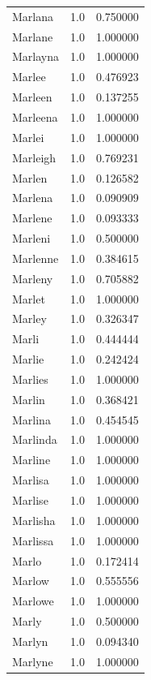 \documentclass[
  letterpaper,
  DIV=11,
  numbers=noendperiod]{scrreprt}
\begin{document}
\begin{tabular}{lrr}
Marlana         &   1.0 &   0.750000 \\
Marlane         &   1.0 &   1.000000 \\
Marlayna        &   1.0 &   1.000000 \\
Marlee          &   1.0 &   0.476923 \\
Marleen         &   1.0 &   0.137255 \\
Marleena        &   1.0 &   1.000000 \\
Marlei          &   1.0 &   1.000000 \\
Marleigh        &   1.0 &   0.769231 \\
Marlen          &   1.0 &   0.126582 \\
Marlena         &   1.0 &   0.090909 \\
Marlene         &   1.0 &   0.093333 \\
Marleni         &   1.0 &   0.500000 \\
Marlenne        &   1.0 &   0.384615 \\
Marleny         &   1.0 &   0.705882 \\
Marlet          &   1.0 &   1.000000 \\
Marley          &   1.0 &   0.326347 \\
Marli           &   1.0 &   0.444444 \\
Marlie          &   1.0 &   0.242424 \\
Marlies         &   1.0 &   1.000000 \\
Marlin          &   1.0 &   0.368421 \\
Marlina         &   1.0 &   0.454545 \\
Marlinda        &   1.0 &   1.000000 \\
Marline         &   1.0 &   1.000000 \\
Marlisa         &   1.0 &   1.000000 \\
Marlise         &   1.0 &   1.000000 \\
Marlisha        &   1.0 &   1.000000 \\
Marlissa        &   1.0 &   1.000000 \\
Marlo           &   1.0 &   0.172414 \\
Marlow          &   1.0 &   0.555556 \\
Marlowe         &   1.0 &   1.000000 \\
Marly           &   1.0 &   0.500000 \\
Marlyn          &   1.0 &   0.094340 \\
Marlyne         &   1.0 &   1.000000 \\

\end{tabular}
\end{document}
